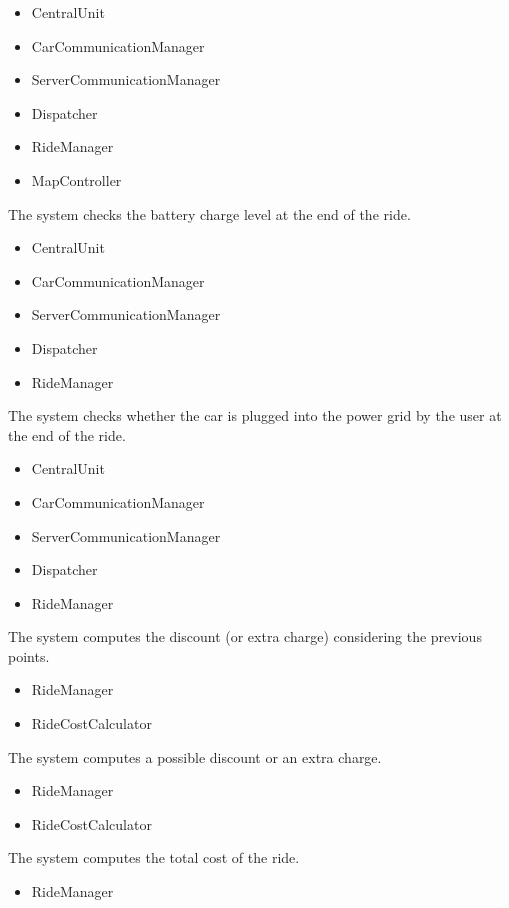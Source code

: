 \documentclass[11pt,a4paper]{report}
\begin{document}
\begin{Req}
\begin{itemize}
				\item CentralUnit
				\item CarCommunicationManager
				\item ServerCommunicationManager
				\item Dispatcher
				\item RideManager
				\item MapController
			\end{itemize}
		\item The system checks the battery charge level at the end of the ride.
			\begin{itemize}
				\item CentralUnit
				\item CarCommunicationManager
				\item ServerCommunicationManager
				\item Dispatcher
				\item RideManager
			\end{itemize}
		\item The system checks whether the car is plugged into the power grid by the user at the end of the ride.
			\begin{itemize}
				\item CentralUnit
				\item CarCommunicationManager
				\item ServerCommunicationManager
				\item Dispatcher
				\item RideManager
			\end{itemize}	
		\item The system computes the discount (or extra charge) considering the previous points.
			\begin{itemize}
				\item RideManager
				\item RideCostCalculator
			\end{itemize}
		\item The system computes a possible discount or an extra charge.
			\begin{itemize}
				\item RideManager
				\item RideCostCalculator
			\end{itemize}
		\item The system computes the total cost of the ride.
			\begin{itemize}
				\item RideManager

\end{itemize}
\end{Req}
\end{document}
